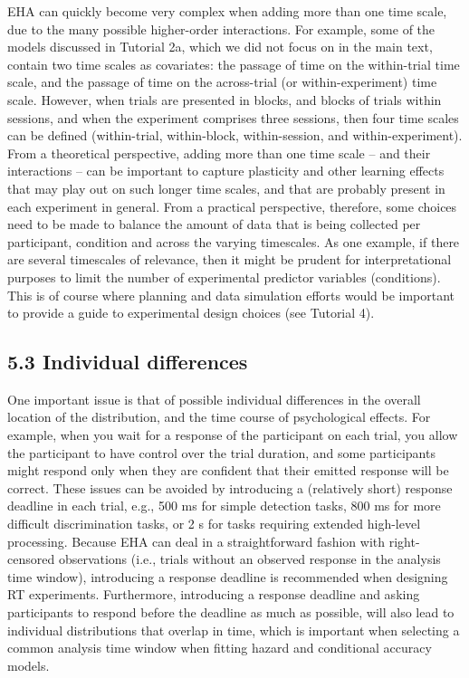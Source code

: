 \documentclass[
  man, donotrepeattitle,floatsintext]{apa6}
\begin{document}
EHA can quickly become very complex when adding more than one time scale, due to the many possible higher-order interactions.
For example, some of the models discussed in Tutorial 2a, which we did not focus on in the main text, contain two time scales as covariates: the passage of time on the within-trial time scale, and the passage of time on the across-trial (or within-experiment) time scale. However, when trials are presented in blocks, and blocks of trials within sessions, and when the experiment comprises three sessions, then four time scales can be defined (within-trial, within-block, within-session, and within-experiment).
From a theoretical perspective, adding more than one time scale -- and their interactions -- can be important to capture plasticity and other learning effects that may play out on such longer time scales, and that are probably present in each experiment in general.
From a practical perspective, therefore, some choices need to be made to balance the amount of data that is being collected per participant, condition and across the varying timescales. As one example, if there are several timescales of relevance, then it might be prudent for interpretational purposes to limit the number of experimental predictor variables (conditions).
This is of course where planning and data simulation efforts would be important to provide a guide to experimental design choices (see Tutorial 4).

\subsection{5.3 Individual differences}\label{individual-differences}

One important issue is that of possible individual differences in the overall location of the distribution, and the time course of psychological effects. For example, when you wait for a response of the participant on each trial, you allow the participant to have control over the trial duration, and some participants might respond only when they are confident that their emitted response will be correct. These issues can be avoided by introducing a (relatively short) response deadline in each trial, e.g., 500 ms for simple detection tasks, 800 ms for more difficult discrimination tasks, or 2 s for tasks requiring extended high-level processing. Because EHA can deal in a straightforward fashion with right-censored observations (i.e., trials without an observed response in the analysis time window), introducing a response deadline is recommended when designing RT experiments. Furthermore, introducing a response deadline and asking participants to respond before the deadline as much as possible, will also lead to individual distributions that overlap in time, which is important when selecting a common analysis time window when fitting hazard and conditional accuracy models.
\end{document}
